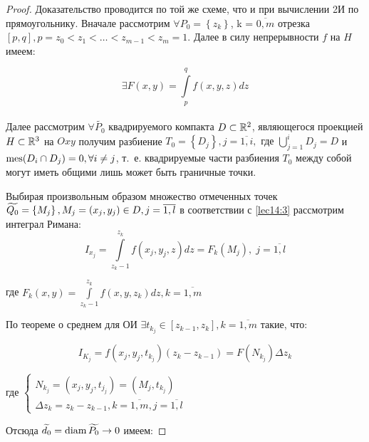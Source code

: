 \documentclass[../../main.tex]{subfiles}
\begin{document}
	\begin{proof}
		Доказательство проводится по той же схеме, что и при вычислении 2И по 
		прямоугольнику. Вначале рассмотрим $\forall P_0 = \left\{ z_k \right\}$, k = 
		$\overline{0, m}$ отрезка $\left[p, q\right], p = z_0 < z_1 < \ldots < z_{m 
		- 1} < z_m = 1.$ Далее в силу непрерывности $f$ на $H$ имеем:
		
		\begin{equation}
		\exists F\left(x, y\right) = \int\limits_{p}^{q} f\left(x, y, z\right) dz
		\label{lec14:3}
		\end{equation}\\
		Далее рассмотрим $\forall \widetilde{P_0}$ квадрируемого компакта $D \subset 
		\mathbb{R}^2$, являющегося проекцией $H \subset \mathbb{R}^3$ на $Oxy$ получим разбиение 
		$T_0 = \left\{D_j \right\}, j = \overline{1, i}, \text{ где } 
		\bigcup\limits_{j = 1}^i D_j = D$ и $\operatorname{mes}(D_i \cap D_j) = 0 , \forall i \neq 
		j$, т.~е. квадрируемые части разбиения $T_0$ между собой могут иметь общими 
		лишь может быть граничные точки.
		
		Выбирая произвольным образом множество отмеченных точек $\widetilde{Q_0} = 
		\left\{ M_j \right\},\\ M_j = \left(x_j, y_j\right) \in D, j = \overline{1, 
		l}$ в соответствии с \eqref{lec14:3} рассмотрим интеграл Римана:
		\begin{equation} 
		I_{x_j} = \int\limits_{z_k - 1}^{z_k} f(x_j, y_j, z)dz = F_k (M_j),\; j = 
		\overline{1, l}  \label{lec14:4}
		\end{equation}
		
		где $F_k(x, y) = \int\limits_{z_k - 1}^{z_k} f\left(x, y, z_k\right)dz, k = 
		\overline{1, m}$
		 
		По теореме о среднем для ОИ $\exists t_{k_{j}} \in \left[z_{k - 1}, z_k 
		\right], k = \overline{1, m}$ такие, что:
		 
		 \begin{equation}
		 	I_{K_j} = f\left(x_j, y_j, t_{k_j}\right)\left(z_k - z_{k - 1}\right) = 
		 	F\left(N_{k_j}\right) \Delta z_k \label{lec14:5}
		 \end{equation}
		
		где $\begin{cases}
		N_{k_j} = (x_j, y_j, t_{j_j}) = (M_j, t_{k_j})\\
		\Delta z_k = z_k - z_{k - 1}, k = \overline{1, m}, j = \overline{1, l}
		\end{cases}$
		
		Отсюда $\widetilde{d_0} = \operatorname{diam} \widetilde{P_0} \to 0$ имеем: 
		

\end{proof}
\end{document}
